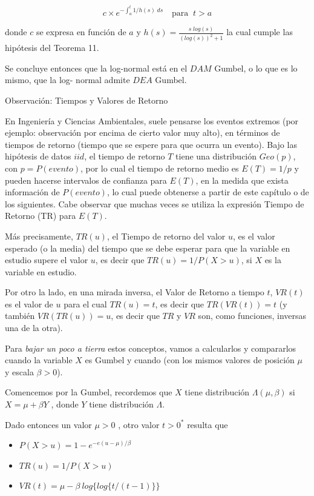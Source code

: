 \documentclass[
  oneside]{book}
\begin{document}
\begin{equation}
c\times e^{-\int_{a}^{t}1/h(s)\; ds} \quad \text{para }\: t>a
\end{equation}

donde \(c\) se expresa en función de \(a\) y
\(h(s)=\frac{s\; log(s)}{(log(s))^2+1}\) la cual cumple las hipótesis
del Teorema 11.

Se concluye entonces que la log-normal está en el \(DAM\) Gumbel, o lo
que es lo mismo, que la log- normal admite \(DEA\) Gumbel.

Observación: Tiempos y Valores de Retorno

En Ingeniería y Ciencias Ambientales, suele pensarse los eventos
extremos (por ejemplo: observación por encima de cierto valor muy alto),
en términos de tiempos de retorno (tiempo que se espere para que ocurra
un evento). Bajo las hipótesis de datos \(iid\), el tiempo de retorno
\(T\) tiene una distribución \(Geo(p)\), con \(p = P(evento)\), por lo
cual el tiempo de retorno medio es \(E(T)=1/p\) y pueden hacerse
intervalos de confianza para \(E(T)\), en la medida que exista
información de \(P(evento)\), lo cual puede obtenerse a partir de este
capítulo o de los siguientes. Cabe observar que muchas veces se utiliza
la expresión Tiempo de Retorno (TR) para \(E(T)\).

Más precisamente, \(TR(u)\), el Tiempo de retorno del valor \(u\), es el
valor esperado (o la media) del tiempo que se debe esperar para que la
variable en estudio supere el valor \(u\), es decir que
\(TR(u) = 1/P(X>u)\), si \(X\) es la variable en estudio.

Por otro la lado, en una mirada inversa, el Valor de Retorno a tiempo
\(t\), \(VR(t)\) es el valor de \(u\) para el cual \(TR(u)=t\), es decir
que \(TR(VR(t))=t\) (y también \(VR(TR(u))=u\), es decir que \(TR\) y
\(VR\) son, como funciones, inversas una de la otra).

Para \textit{bajar un poco a tierra} estos conceptos, vamos a
calcularlos y compararlos cuando la variable \(X\) es Gumbel y cuando
(con los mismos valores de posición \(\mu\) y escala \(\beta>0\)).

Comencemos por la Gumbel, recordemos que \(X\) tiene distribución
\(\Lambda( \mu,\beta)\) si \(X= \mu+\beta Y\) , donde \(Y\) tiene
distribución \(\Lambda\).

Dado entonces un valor \(\mu>0\) , otro valor \(t>0^*\) resulta que

\begin{itemize}
\item $P(X>u)=1-e^{-e{(u-\mu)/ β }}$
\item $TR(u)=1/P(X>u)$
\item $VR(t)= \mu-\beta\: log\{log\{t/(t-1)\}\}$
\end{itemize}
\end{document}
